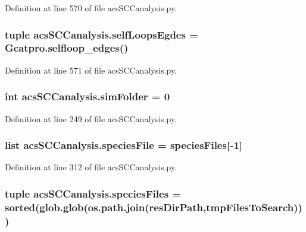 Definition at line 570 of file acs\-S\-C\-Canalysis.\-py.

\hypertarget{a00128_ad34596e89eef2cfb696f61a810765c7a}{
\subsubsection[{self\-Loops\-Egdes}]{\setlength{\rightskip}{0pt plus 5cm}tuple acs\-S\-C\-Canalysis.\-self\-Loops\-Egdes = Gcatpro.\-selfloop\-\_\-edges()}}\label{a00128_ad34596e89eef2cfb696f61a810765c7a}


Definition at line 571 of file acs\-S\-C\-Canalysis.\-py.

\hypertarget{a00128_a58095f64afeda893517e81226e1963c3}{
\subsubsection[{sim\-Folder}]{\setlength{\rightskip}{0pt plus 5cm}int acs\-S\-C\-Canalysis.\-sim\-Folder = 0}}\label{a00128_a58095f64afeda893517e81226e1963c3}


Definition at line 249 of file acs\-S\-C\-Canalysis.\-py.

\hypertarget{a00128_a1d066fa24dced2da12ffd9a8514a17ba}{
\subsubsection[{species\-File}]{\setlength{\rightskip}{0pt plus 5cm}list acs\-S\-C\-Canalysis.\-species\-File = {\bf species\-Files}\mbox{[}-\/1\mbox{]}}}\label{a00128_a1d066fa24dced2da12ffd9a8514a17ba}


Definition at line 312 of file acs\-S\-C\-Canalysis.\-py.

\hypertarget{a00128_a4f47408478e9a0590d016df50cf42141}{
\subsubsection[{species\-Files}]{\setlength{\rightskip}{0pt plus 5cm}tuple acs\-S\-C\-Canalysis.\-species\-Files = sorted(glob.\-glob(os.\-path.\-join({\bf res\-Dir\-Path},{\bf tmp\-Files\-To\-Search})))}}\label{a00128_a4f47408478e9a0590d016df50cf42141}


